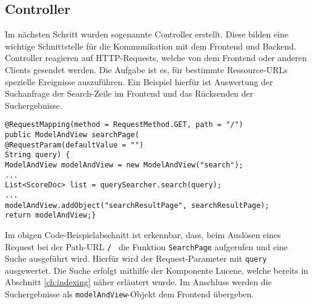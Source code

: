 \subsection{Controller}
Im nächsten Schritt wurden sogenannte Controller erstellt.
Diese bilden eine wichtige Schnittstelle für die Kommunikation mit dem Frontend und Backend.
Controller reagieren auf HTTP-Requests, welche von dem Frontend oder anderen Clients gesendet werden.
Die Aufgabe ist es, für bestimmte Ressource-URLs spezielle Ereignisse auszuführen.
Ein Beispiel hierfür ist Auswertung der Suchanfrage der Search-Zeile im Frontend  und das Rücksenden der Suchergebnisse.
\begin{lstlisting}
@RequestMapping(method = RequestMethod.GET, path = "/")
public ModelAndView searchPage(
@RequestParam(defaultValue = "")
String query) {
ModelAndView modelAndView = new ModelAndView("search");
...
List<ScoreDoc> list = querySearcher.search(query);
...
modelAndView.addObject("searchResultPage", searchResultPage);
return modelAndView;}
\end{lstlisting}

Im obigen Code-Beispielabschnitt ist erkennbar, dass, beim Auslösen eines Request bei der Path-URL \texttt{\glqq/\grqq~} die Funktion \texttt{SearchPage} aufgerufen und eine Suche ausgeführt wird.
Hierfür wird der Request-Parameter mit \texttt{query} ausgewertet.
Die Suche erfolgt mithilfe der Komponente Lucene, welche bereits in Abschnitt \ref{ch:indexing} näher erläutert wurde.
Im Anschluss werden die Suchergebnisse als \texttt{modelAndView}-Objekt dem Frontend übergeben. 
